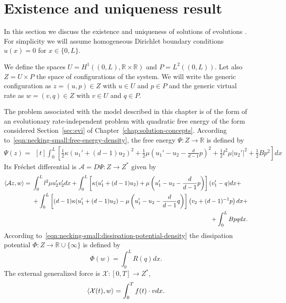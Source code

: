 \documentclass[a4paper,10pt,twoside]{amsbook}
\numberwithin{section}{chapter}
\numberwithin{equation}{chapter}
\theoremstyle{definition}
\DeclarePairedDelimiter{\dual}{\langle}{\rangle}
\begin{document}
\section{Existence and uniqueness result}

\label{sec:small-neck:existence}

In this section we discuss the existence and uniqueness of solutions of evolutions . For simplicity we will assume homogeneous Dirichlet boundary conditions $u(x)=0$ for $x\in\{0,L\}$.

We define the spaces $U=H^1((0,L),\mathbb{R}\times\mathbb{R})$ and $P=L^2((0,L))$. Let also $Z=U\times P$ the space of configurations of the system. We will write the generic configuration as $z=(u,p)\in Z$ with $u\in U$ and $p\in P$ and the generic virtual rate as $w=(v,q)\in Z$ with $v\in U$ and $q\in P$.

The problem associated with the model described in this chapter is of the form of an evolutionary rate-independent problem with quadratic free energy of the form considered Section~\ref{sec:evi} of Chapter~\ref{chap:solution-concepts}. According to~\eqref{eqn:necking-small:free-energy-density}, the free energy $\Psi\colon Z\to\mathbb{R}$ is defined by
\[
\Psi(z)=
\begin{multlined}[t]
\int_0^L\left[\frac{1}{2}\kappa(u_1'+(d-1)u_2)^2+\frac{1}{2}\mu\left(u_1'-u_2-\frac{d}{d-1}p\right)^2+\frac{1}{2}l^2\mu |u_2'|^2+\frac{1}{2}Bp^2\right]dx
\end{multlined}
\]
Its Fréchet differential is $\mathcal{A}=D\Psi\colon Z\to Z^*$ given by
\[
\dual{\mathcal{A}z,w}=
\begin{multlined}[t]
\int_0^Ll^2\mu u_2'v_2'dx+\int_0^L\left[\kappa(u_1'+(d-1)u_2)+\mu\left(u_1'-u_2-\frac{d}{d-1}p\right)\right](v_1'-q)dx+\\
+\int_0^L\left[(d-1)\kappa(u_1'+(d-1)u_2)-\mu\left(u_1'-u_2-\frac{d}{d-1}q\right)\right]\left(v_2+(d-1)^{-1}p\right)dx+\\
+\int_0^LBpqdx.
\end{multlined}
\]
According to~\eqref{eqn:necking-small:dissipation-potential-density} the dissipation potential $\Phi\colon Z\to\mathbb{R}\cup\{\infty\}$ is defined by
\[
\Phi(w)=\int_0^LR(q)dx.
\]
The external generalized force is $\mathcal{X}\colon[0,T]\to Z^*$,
\[
\dual{\mathcal{X}(t),w}=\int_0^Tf(t)\cdot vdx.
\]
\end{document}

